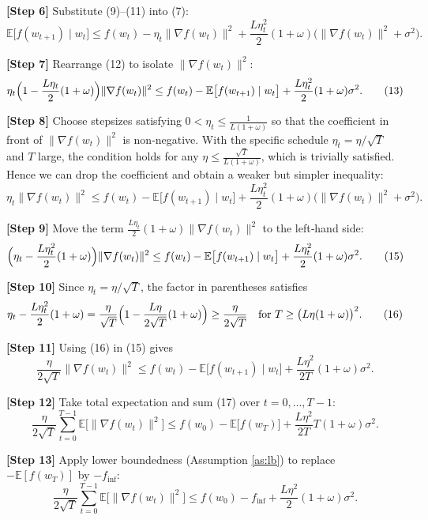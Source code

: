 \documentclass{article}
\newcommand{\EE}{\mathbb{E}}
\begin{document}
\noindent\textbf{[Step 6]} Substitute (9)–(11) into (7):
\[
\EE\big[f(w_{t+1})\mid w_t\big]
\le f(w_t)-\eta_t\|\nabla f(w_t)\|^{2}
+\frac{L\eta_t^{2}}{2}(1+\omega)\big(\|\nabla f(w_t)\|^{2}+\sigma^{2}\big). \tag{12}
\]

\noindent\textbf{[Step 7]} Rearrange (12) to isolate $\|\nabla f(w_t)\|^{2}$:
\[
\eta_t\Bigl(1-\frac{L\eta_t}{2}(1+\omega)\Bigr)\|\nabla f(w_t)\|^{2}
\le f(w_t)-\EE\big[f(w_{t+1})\mid w_t\big]
+\frac{L\eta_t^{2}}{2}(1+\omega)\sigma^{2}. \tag{13}
\]

\noindent\textbf{[Step 8]} Choose stepsizes satisfying $0<\eta_t\le \frac{1}{L(1+\omega)}$ so that the coefficient in front of $\|\nabla f(w_t)\|^{2}$ is non‑negative. With the specific schedule $\eta_t=\eta/\sqrt{T}$ and $T$ large, the condition holds for any $\eta\le \frac{\sqrt{T}}{L(1+\omega)}$, which is trivially satisfied. Hence we can drop the coefficient and obtain a weaker but simpler inequality:
\[
\eta_t\|\nabla f(w_t)\|^{2}
\le f(w_t)-\EE\big[f(w_{t+1})\mid w_t\big]
+\frac{L\eta_t^{2}}{2}(1+\omega)\big(\|\nabla f(w_t)\|^{2}+\sigma^{2}\big). \tag{14}
\]

\noindent\textbf{[Step 9]} Move the term $\frac{L\eta_t}{2}(1+\omega)\|\nabla f(w_t)\|^{2}$ to the left‑hand side:
\[
\Bigl(\eta_t-\frac{L\eta_t^{2}}{2}(1+\omega)\Bigr)\|\nabla f(w_t)\|^{2}
\le f(w_t)-\EE\big[f(w_{t+1})\mid w_t\big]
+\frac{L\eta_t^{2}}{2}(1+\omega)\sigma^{2}. \tag{15}
\]

\noindent\textbf{[Step 10]} Since $\eta_t=\eta/\sqrt{T}$, the factor in parentheses satisfies
\[
\eta_t-\frac{L\eta_t^{2}}{2}(1+\omega)
= \frac{\eta}{\sqrt{T}}\Bigl(1-\frac{L\eta}{2\sqrt{T}}(1+\omega)\Bigr)
\ge \frac{\eta}{2\sqrt{T}} \quad\text{for }T\ge \bigl(L\eta(1+\omega)\bigr)^{2}.
\tag{16}
\]

\noindent\textbf{[Step 11]} Using (16) in (15) gives
\[
\frac{\eta}{2\sqrt{T}}\|\nabla f(w_t)\|^{2}
\le f(w_t)-\EE\big[f(w_{t+1})\mid w_t\big]
+\frac{L\eta^{2}}{2T}(1+\omega)\sigma^{2}. \tag{17}
\]

\noindent\textbf{[Step 12]} Take total expectation and sum (17) over $t=0,\dots,T-1$:
\[
\frac{\eta}{2\sqrt{T}}\sum_{t=0}^{T-1}\EE\!\big[\|\nabla f(w_t)\|^{2}\big]
\le f(w_0)-\EE\big[f(w_T)\big]
+ \frac{L\eta^{2}}{2T}T(1+\omega)\sigma^{2}. \tag{18}
\]

\noindent\textbf{[Step 13]} Apply lower boundedness (Assumption \ref{as:lb}) to replace $-\EE[f(w_T)]$ by $-f_{\inf}$:
\[
\frac{\eta}{2\sqrt{T}}\sum_{t=0}^{T-1}\EE\!\big[\|\nabla f(w_t)\|^{2}\big]
\le f(w_0)-f_{\inf}
+ \frac{L\eta^{2}}{2}(1+\omega)\sigma^{2}. \tag{19}
\]
\end{document}
